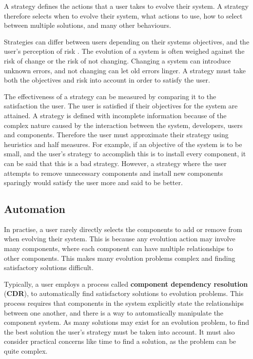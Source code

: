 A strategy defines the actions that a user takes to evolve their system.
A strategy therefore selects when to evolve their system, what actions to use, how to select between multiple solutions, and many other behaviours.

Strategies can differ between users depending on their systems objectives, and the user's perception of risk \citep{iso2009}.
The evolution of a system is often weighed against the risk of change or the risk of not changing.
Changing a system can introduce unknown errors, and not changing can let old errors linger. 
A strategy must take both the objectives and risk into account in order to satisfy the user.

The effectiveness of a strategy can be measured by comparing it to the satisfaction the user.
The user is satisfied if their objectives for the system are attained.
A strategy is defined with incomplete information because of the complex nature caused by the interaction between the system, developers, users and components.
Therefore the user must approximate their strategy using heuristics and half measures.
For example, if an objective of the system is to be small, and the user's strategy to accomplish this is to install every component, it can be said that this is a bad strategy. 
However, a strategy where the user attempts to remove unnecessary components and install new components sparingly would satisfy the user more and said to be better.

\subsection{Automation}
In practise, a user rarely directly selects the components to add or remove from when evolving their system.
This is because any evolution action may involve many components, where each component can have multiple relationships to other components.
This makes many evolution problems complex and finding satisfactory solutions difficult.

Typically, a user employs a process called \textbf{component dependency resolution} (\textbf{CDR}), to automatically find satisfactory solutions to evolution problems.
This process requires that components in the system explicitly state the relationships between one another, and there is a way to automatically manipulate the component system.
As many solutions may exist for an evolution problem, to find the best solution the user's strategy must be taken into account.
It must also consider practical concerns like time to find a solution, as the problem can be quite complex.

